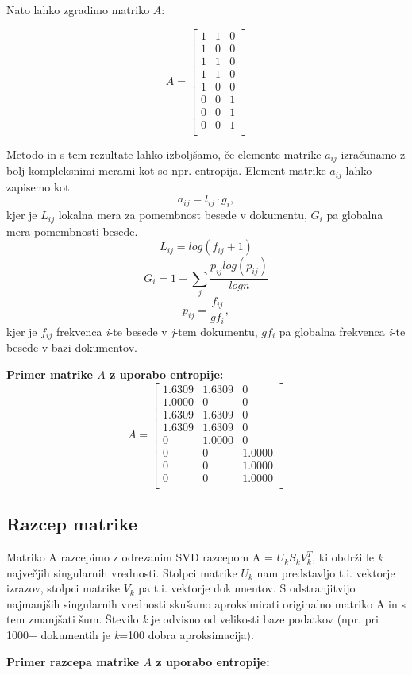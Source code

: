 \documentclass{article}
\begin{document}
Nato lahko zgradimo matriko $A$:

\[
A = \begin{bmatrix}
        1 & 1 & 0 \\
        1 & 0 & 0 \\
        1 & 1 & 0 \\
        1 & 1 & 0 \\
        1 & 0 & 0 \\
        0 & 0 & 1 \\
        0 & 0 & 1 \\       
        0 & 0 & 1 \\
 \end{bmatrix}
\]

\par Metodo in s tem rezultate lahko izboljšamo, če elemente matrike $a_{ij}$ izračunamo z bolj kompleksnimi merami kot so npr. entropija. Element matrike $a_{ij}$ lahko zapisemo kot
\[ a_{ij} = l_{ij} \cdot g_i,\]
kjer je $L_{ij}$ lokalna mera za pomembnost besede v dokumentu, $G_i$ pa globalna mera pomembnosti besede.
\[ L_{ij} = log(f_{ij} + 1)\]
\[ G_i = 1 - \sum_{j} \frac{p_{ij} log(p_{ij})}{logn} \]
\[ p_{ij} = \frac{f_{ij}}{gf_i},\]
kjer je $f_{ij}$ frekvenca \textit{i}-te besede v \textit{j}-tem dokumentu, $gf_i$ pa globalna frekvenca \textit{i}-te besede v bazi dokumentov. 
\par \textbf{Primer matrike $A$ z uporabo entropije:}
\[
A = \begin{bmatrix}
    1.6309  & 1.6309 &  0 \\
    1.0000  & 0      &  0 \\
    1.6309  & 1.6309 &  0 \\
    1.6309  & 1.6309 &  0 \\
    0       & 1.0000 &  0 \\
    0       & 0      &  1.0000 \\
    0       & 0      &  1.0000 \\
    0       & 0      &  1.0000 \\
 \end{bmatrix}
\]

\subsection{Razcep matrike}
\par Matriko A razcepimo z odrezanim SVD razcepom A = $U_kS_kV_k^T$, ki obdrži le \textit{k} največjih singularnih vrednosti. Stolpci matrike $U_k$ nam predstavljo t.i. vektorje izrazov, stolpci matrike $V_k$ pa t.i. vektorje dokumentov. S odstranjitvijo najmanjših singularnih vrednosti skušamo aproksimirati originalno matriko A in s tem zmanjšati šum. Število \textit{k} je odvisno od velikosti baze podatkov (npr. pri 1000+ dokumentih je \textit{k}=100 dobra aproksimacija).
\par \textbf{Primer razcepa matrike $A$ z uporabo entropije:}
\end{document}
